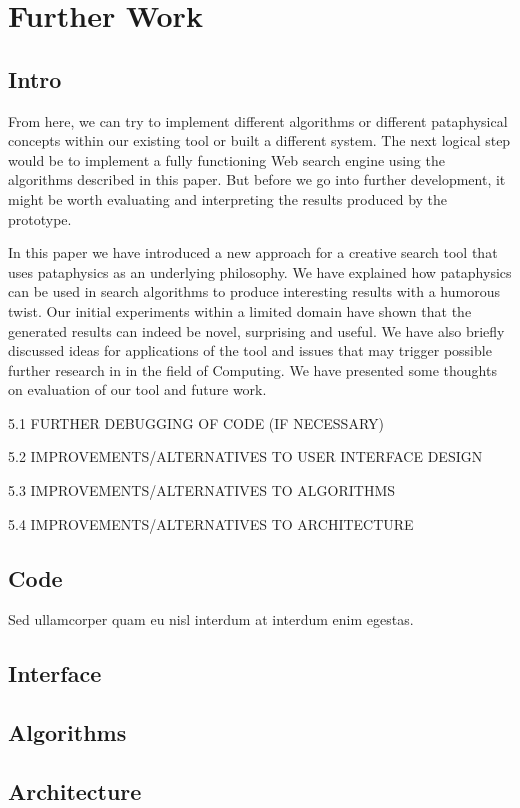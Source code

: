 
\pagestyle{fancy}

\chapter{Further Work}
\label{FurtherWork}


\section{Intro}

From here, we can try to implement different algorithms or different pataphysical concepts within our existing tool or built a different system. The next logical step would be to implement a fully functioning Web search engine using the algorithms described in this paper. But before we go into further development, it might be worth evaluating and interpreting the results produced by the prototype.

In this paper we have introduced a new approach for a creative search tool that uses pataphysics as an underlying philosophy.  We have explained how pataphysics can be used in search algorithms to produce interesting results with a humorous twist. Our initial experiments within a limited domain have shown that the generated results can indeed be novel, surprising and useful. We have also briefly discussed ideas for applications of the tool and issues that may trigger possible further research in in the field of Computing. We have presented some thoughts on evaluation of our tool and future work.

5.1	FURTHER DEBUGGING OF CODE (IF NECESSARY)

5.2	IMPROVEMENTS/ALTERNATIVES TO USER INTERFACE DESIGN

5.3	IMPROVEMENTS/ALTERNATIVES TO ALGORITHMS

5.4	IMPROVEMENTS/ALTERNATIVES TO ARCHITECTURE
 

\section{Code}

Sed ullamcorper quam eu nisl interdum at interdum enim egestas.


\section{Interface}


\section{Algorithms}


\section{Architecture}
